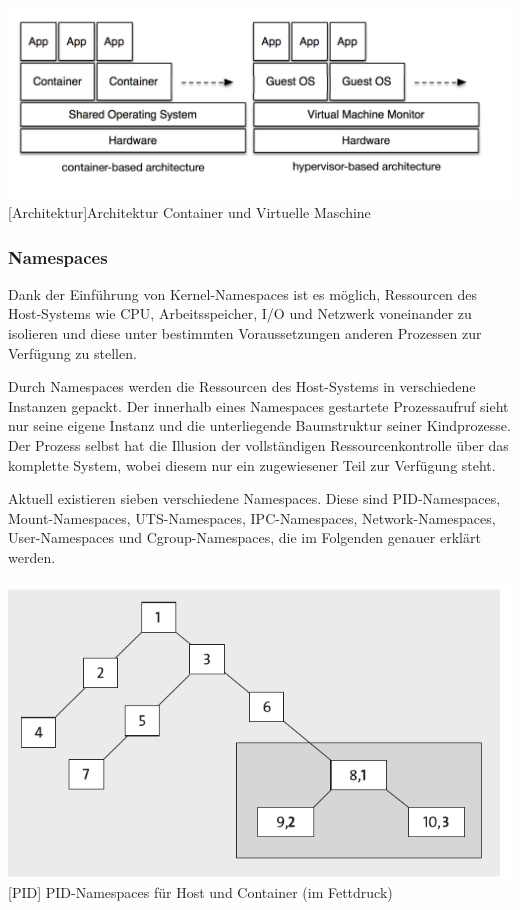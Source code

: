 \vspace{1em}
\begin{minipage}{\linewidth}
	\centering
	\includegraphics[width=1\linewidth]{pics/docker2.png}
	[Architektur]{Architektur Container und Virtuelle Maschine \cite{Xavier2015AClouds}}
	\label{fig:architecture}
\end{minipage}

\subsubsection{Namespaces}
Dank der Einführung von Kernel-Namespaces ist es möglich, Ressourcen des Host-Systems wie CPU, Arbeitsspeicher, I/O und Netzwerk voneinander zu isolieren und diese unter bestimmten Voraussetzungen anderen Prozessen zur Verfügung zu stellen. 

Durch Namespaces werden die Ressourcen des Host-Systems in verschiedene Instanzen gepackt. Der innerhalb eines Namespaces gestartete Prozessaufruf sieht nur seine eigene Instanz und die unterliegende Baumstruktur seiner Kindprozesse. Der Prozess selbst hat die Illusion der vollständigen Ressourcenkontrolle über das komplette System, wobei diesem nur ein zugewiesener Teil zur Verfügung steht.

Aktuell existieren sieben verschiedene Namespaces. Diese sind \ac{PID}-Namespaces, Mount-Namespaces, \ac{UTS}-Namespaces, \ac{IPC}-Namespaces, Network-Namespaces, User-Namespaces und \ac{Cgroup}-Namespaces, die im Folgenden genauer erklärt werden.



\vspace{1em}
\begin{minipage}{\linewidth}
	\centering
	\includegraphics[width=1\linewidth]{pics/PID.PNG}
	[PID]{ PID-Namespaces für Host und Container (im Fettdruck) \cite{Liebel2017SkalierbareContainer-Infrastrukturen}}
	\label{fig:PID}
\end{minipage}

